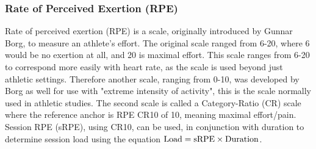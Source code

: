\subsubsection{Rate of Perceived Exertion (RPE)} \label{subsub:rpe}
Rate of perceived exertion (RPE) is a scale, originally introduced by Gunnar Borg, to measure an athlete's effort. The original scale ranged from 6-20, where 6 would be no exertion at all, and 20 is maximal effort. This scale ranges from 6-20 to correspond more easily with heart rate, as the scale is used beyond just athletic settings. Therefore another scale, ranging from 0-10, was developed by Borg as well for use with "extreme intensity of activity", this is the scale normally used in athletic studies. The second scale is called a Category-Ratio (CR) scale where the reference anchor is RPE CR10 of 10, meaning maximal effort/pain. Session RPE (sRPE), using CR10, can be used, in conjunction with duration to determine session load \cite{Williams2017} using the equation $\textnormal{Load} = \textnormal{sRPE} \times \textnormal{Duration}$.


